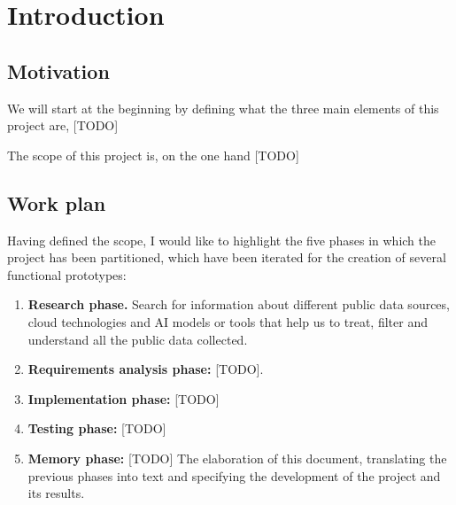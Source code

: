\chapter{Introduction}
\label{cap:introduction}


\section{Motivation}

We will start at the beginning by defining what the three main elements of this project are, [TODO] 


The scope of this project is, on the one hand [TODO]

\section{Work plan}


Having defined the scope, I would like to highlight the five phases in which the project has been partitioned, which have been iterated for the creation of several functional prototypes:


\begin{enumerate}
	\item \textbf{Research phase.} Search for information about different public data sources, cloud technologies and AI models or tools that help us to treat, filter and understand all the public data collected.
	
	\item \textbf{Requirements analysis phase:} [TODO].
	
	\item \textbf{Implementation phase:} [TODO]

	\item \textbf{Testing phase:} [TODO]
	
	\item \textbf{Memory phase:} [TODO] The elaboration of this document, translating the previous phases into text and specifying the development of the project and its results.

\end{enumerate}
